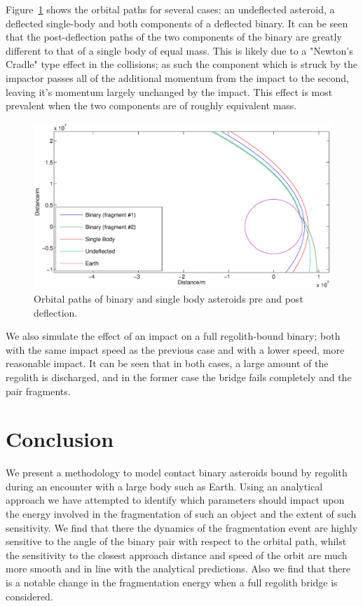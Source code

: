 \documentclass[letterpaper, preprint, paper,11pt]{AAS}	%
\begin{document}
Figure~\ref{fig:bouncey} shows the orbital paths for several cases: an undeflected asteroid, a deflected single-body and both components of a deflected binary. It can be seen that the post-deflection paths of the two components of the binary are greatly different to that of a single body of equal mass. This is likely due to a "Newton's Cradle" type effect in the collisions; as such the component which is struck by the impactor passes all of the additional momentum from the impact to the second, leaving it's momentum largely unchanged by the impact. This effect is most prevalent when the two components are of roughly equivalent mass.
\begin{figure}[H]
\centering
\centerline{\includegraphics[width=1.2\textwidth]{deflection_0.eps}} 
\caption{Orbital paths of binary and single body asteroids pre and post deflection.} 
\label{fig:bouncey}
\end{figure} 

We also simulate the effect of an impact on a full regolith-bound binary; both with the same impact speed as the previous case and with a lower speed, more reasonable impact. It can be seen that in both cases, a large amount of the regolith is discharged, and in the former case the bridge fails completely and the pair fragments.

\section{Conclusion}
We present a methodology to model contact binary asteroids bound by regolith during an encounter with a large body such as Earth. Using an analytical approach we have attempted to identify which parameters should impact upon the energy involved in the fragmentation of such an object and the extent of such sensitivity. We find that there the dynamics of the fragmentation event are highly sensitive to the angle of the binary pair with respect to the orbital path, whilst the sensitivity to the closest approach distance and speed of the orbit are much more smooth and in line with the analytical predictions. Also we find that there is a notable change in the fragmentation energy when a full regolith bridge is considered.
\end{document}
